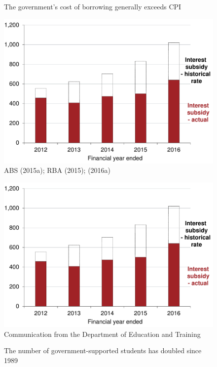 \documentclass[embargoed]{grattan}
\begin{document}
\begin{figure}

\begin{minipage}[t][\textheight]{\columnwidth}
\vspace{\grattanfptop}
\caption[The government's cost of borrowing generally exceeds CPI]{The government's cost of borrowing generally exceeds \gls{CPI}}\label{fig:fig2-governments-cost-of-borrowing-exceeds-CPI}

\includegraphics[page=2]{atlas/Chartpack.pdf}
%
{ABS (2015a); RBA (2015); (2016a)}
\end{minipage} \hfill
\begin{minipage}[t][\textheight]{\columnwidth}
\vspace{\grattanfptop}
\caption{The number of government-supported students has doubled since 1989}\label{fig:fig3-number-govt-supported-students-doubled-since-1989}

\includegraphics[page=3]{atlas/Chartpack.pdf}
%
{Communication from the Department of Education and Training}
\end{minipage}
\end{figure}
\end{document}
